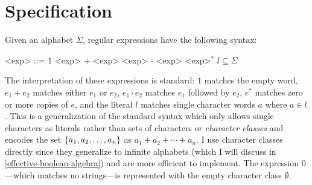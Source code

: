 \documentclass[11pt]{article}
\begin{document}
\section{Specification}

Given an alphabet $\Sigma$, regular expressions have the following syntax:
\begin{grammar}
  <exp> ::= 1
  \alt <exp> + <exp>
  \alt <exp> $\cdot$ <exp>
  \alt <exp>$^*$
  \alt $l \subseteq \Sigma$
\end{grammar}

The interpretation of these expressions is standard:
$1$ matches the empty word,
$e_1 + e_2$ matches either $e_1$ or $e_2$,
$e_1 \cdot e_2$ matches $e_1$ followed by $e_2$,
$e^*$ matches zero or more copies of $e$,
and the literal $l$ matches single character words $a$ where $a \in l$.
This is a generalization of the standard syntax which only allows single characters as literals rather than sets of characters or \emph{character classes} and encodes the set $\lbrace a_1, a_2, \ldots, a_n\rbrace$ as $a_1 + a_2 + \cdots + a_n$. I use character classes directly since they generalize to infinite alphabets (which I will discuss in \cref{effective-boolean-algebra}) and are more efficient to implement. The expression 0---which matches no strings---is represented with the empty character class $\emptyset$.
\end{document}
